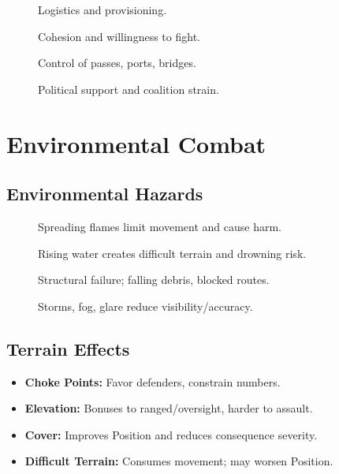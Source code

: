 \begin{description}
  \item[] Logistics and provisioning. 
  \item[] Cohesion and willingness to fight. 
  \item[] Control of passes, ports, bridges. 
  \item[] Political support and coalition strain. 
\end{description}

\section{Environmental Combat}
\label{sec:environmental-combat}

\subsection{Environmental Hazards}
\label{subsec:environmental-hazards}

\begin{description}
  \item[] Spreading flames limit movement and cause harm. 
  \item[] Rising water creates difficult terrain and drowning risk. 
  \item[] Structural failure; falling debris, blocked routes. 
  \item[] Storms, fog, glare reduce visibility/accuracy. 
\end{description}

\subsection{Terrain Effects}
\label{subsec:terrain-effects}

\begin{itemize}
  \item \textbf{Choke Points:} Favor defenders, constrain numbers.
  \item \textbf{Elevation:} Bonuses to ranged/oversight, harder to assault.
  \item \textbf{Cover:} Improves Position and reduces consequence severity.
  \item \textbf{Difficult Terrain:} Consumes movement; may worsen Position.
\end{itemize}

